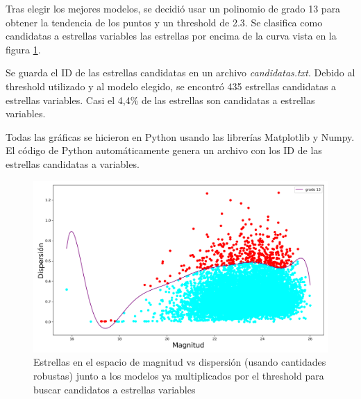 \documentclass[12pt]{article}
\begin{document}
Tras elegir los mejores modelos, se decidió usar un polinomio de grado 13 para obtener la tendencia de los puntos y un threshold de 2.3. Se clasifica como candidatas a estrellas variables las estrellas por encima de la curva vista en la figura \ref{figura2}.

Se guarda el ID de las estrellas candidatas en un archivo \emph{candidatas.txt}. Debido al threshold utilizado y al modelo elegido, se encontró 435 estrellas candidatas a estrellas variables. Casi el 4,4\% de las estrellas son candidatas a estrellas variables. 

Todas las gráficas se hicieron en Python usando las librerías Matplotlib y Numpy. El código de Python automáticamente genera un archivo  con los ID de las estrellas candidatas a variables.

\begin{figure}[ht!]
  \centering
   \includegraphics[scale = 0.6]{fits2.png}
  \caption{Estrellas en el espacio de magnitud vs dispersión (usando cantidades robustas) junto a los modelos ya multiplicados por el threshold para buscar candidatos a estrellas variables }
  \label{figura2}
\end{figure}


%

\end{document}
